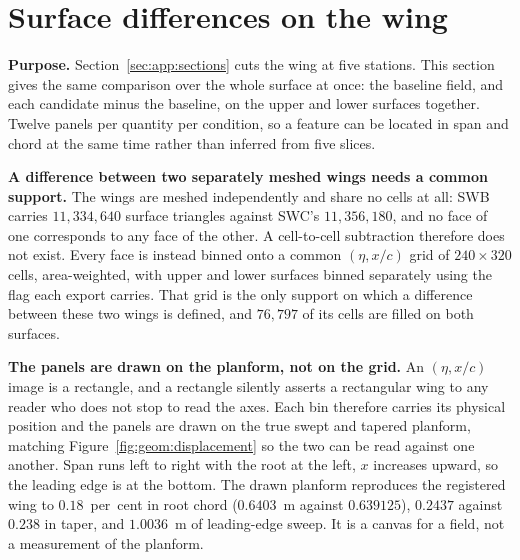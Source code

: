 \section{Surface differences on the wing}
\label{sec:deltamaps}

\textbf{Purpose.} Section~\ref{sec:app:sections} cuts the wing at five stations. This section
gives the same comparison over the whole surface at once: the baseline field, and each
candidate minus the baseline, on the upper and lower surfaces together. Twelve panels per
quantity per condition, so a feature can be located in span and chord at the same time rather
than inferred from five slices.

\textbf{A difference between two separately meshed wings needs a common support.} The wings
are meshed independently and share no cells at all: SWB carries $11{,}334{,}640$ surface
triangles against SWC's $11{,}356{,}180$, and no face of one corresponds to any face of the
other. A cell-to-cell subtraction therefore does not exist. Every face is instead binned onto a
common $(\eta, x/c)$ grid of $240 \times 320$ cells, area-weighted, with upper and lower
surfaces binned separately using the flag each export carries. That grid is the only support on
which a difference between these two wings is defined, and $76{,}797$ of its cells are filled
on both surfaces.

\textbf{The panels are drawn on the planform, not on the grid.} An $(\eta, x/c)$ image is a
rectangle, and a rectangle silently asserts a rectangular wing to any reader who does not stop
to read the axes. Each bin therefore carries its physical position and the panels are drawn on
the true swept and tapered planform, matching Figure~\ref{fig:geom:displacement} so the two can be read
against one another. Span runs left to right with the root at the left, $x$ increases upward, so
the leading edge is at the bottom. The drawn planform reproduces the registered wing to
$0.18$~per~cent in root chord ($0.6403$~m against $0.639125$), $0.2437$ against $0.238$ in
taper, and $1.0036$~m of leading-edge sweep. It is a canvas for a field, not a measurement of
the planform.

